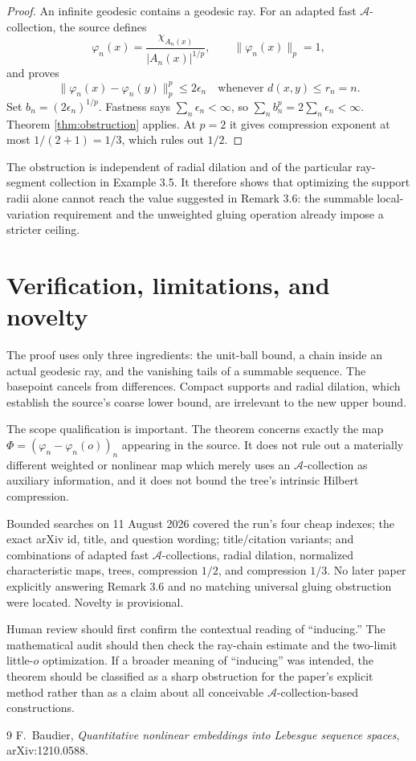 \documentclass[11pt]{article}
\begin{document}
\begin{proof}
An infinite geodesic contains a geodesic ray.  For an adapted fast
$\mathcal A$-collection, the source defines
\[
 \varphi_n(x)=\frac{\chi_{A_n(x)}}{|A_n(x)|^{1/p}},
 \qquad \|\varphi_n(x)\|_p=1,
\]
and proves
\[
 \|\varphi_n(x)-\varphi_n(y)\|_p^p\le2\epsilon_n
 \quad\text{whenever }d(x,y)\le r_n=n.
\]
Set $b_n=(2\epsilon_n)^{1/p}$.  Fastness says
$\sum_n\epsilon_n<\infty$, so
$\sum_n b_n^p=2\sum_n\epsilon_n<\infty$.  Theorem
\ref{thm:obstruction} applies.  At $p=2$ it gives compression exponent at
most $1/(2+1)=1/3$, which rules out $1/2$.
\end{proof}

The obstruction is independent of radial dilation and of the particular
ray-segment collection in Example 3.5.  It therefore shows that optimizing
the support radii alone cannot reach the value suggested in Remark 3.6: the
summable local-variation requirement and the unweighted gluing operation
already impose a stricter ceiling.

\section{Verification, limitations, and novelty}

The proof uses only three ingredients: the unit-ball bound, a chain inside an
actual geodesic ray, and the vanishing tails of a summable sequence.  The
basepoint cancels from differences.  Compact supports and radial dilation,
which establish the source's coarse lower bound, are irrelevant to the new
upper bound.

The scope qualification is important.  The theorem concerns exactly the map
$\Phi=(\varphi_n-\varphi_n(o))_n$ appearing in the source.  It does not rule
out a materially different weighted or nonlinear map which merely uses an
$\mathcal A$-collection as auxiliary information, and it does not bound the
tree's intrinsic Hilbert compression.

Bounded searches on 11 August 2026 covered the run's four cheap indexes; the
exact arXiv id, title, and question wording; title/citation variants; and
combinations of adapted fast $\mathcal A$-collections, radial dilation,
normalized characteristic maps, trees, compression $1/2$, and compression
$1/3$.  No later paper explicitly answering Remark 3.6 and no matching
universal gluing obstruction were located.  Novelty is provisional.

Human review should first confirm the contextual reading of ``inducing.''
The mathematical audit should then check the ray-chain estimate and the
two-limit little-$o$ optimization.  If a broader meaning of ``inducing'' was
intended, the theorem should be classified as a sharp obstruction for the
paper's explicit method rather than as a claim about all conceivable
$\mathcal A$-collection-based constructions.

\begin{thebibliography}{9}
F.~Baudier,
\emph{Quantitative nonlinear embeddings into Lebesgue sequence spaces},
arXiv:1210.0588.
\end{thebibliography}
\end{document}
